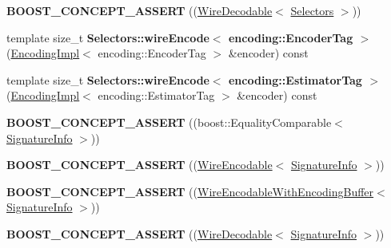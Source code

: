 \begin{DoxyCompactItemize}
\item 
{\bfseries B\+O\+O\+S\+T\+\_\+\+C\+O\+N\+C\+E\+P\+T\+\_\+\+A\+S\+S\+E\+RT} ((\hyperlink{classndn_1_1WireDecodable}{Wire\+Decodable}$<$ \hyperlink{classndn_1_1Selectors}{Selectors} $>$))\hypertarget{namespacendn_a677b3d73070aa153cf835c8416802717}{}\label{namespacendn_a677b3d73070aa153cf835c8416802717}

\item 
template size\+\_\+t {\bfseries Selectors\+::wire\+Encode$<$ encoding\+::\+Encoder\+Tag $>$} (\hyperlink{classndn_1_1encoding_1_1EncodingImpl}{Encoding\+Impl}$<$ encoding\+::\+Encoder\+Tag $>$ \&encoder) const\hypertarget{namespacendn_ab2ee85b9fceb3f1bd7cf1f25bd6071b1}{}\label{namespacendn_ab2ee85b9fceb3f1bd7cf1f25bd6071b1}

\item 
template size\+\_\+t {\bfseries Selectors\+::wire\+Encode$<$ encoding\+::\+Estimator\+Tag $>$} (\hyperlink{classndn_1_1encoding_1_1EncodingImpl}{Encoding\+Impl}$<$ encoding\+::\+Estimator\+Tag $>$ \&encoder) const\hypertarget{namespacendn_a2860609234ff0625a471be5b9ad144dc}{}\label{namespacendn_a2860609234ff0625a471be5b9ad144dc}

\item 
{\bfseries B\+O\+O\+S\+T\+\_\+\+C\+O\+N\+C\+E\+P\+T\+\_\+\+A\+S\+S\+E\+RT} ((boost\+::\+Equality\+Comparable$<$ \hyperlink{classndn_1_1SignatureInfo}{Signature\+Info} $>$))\hypertarget{namespacendn_a8b7141d65e44253576b4180f77ac761e}{}\label{namespacendn_a8b7141d65e44253576b4180f77ac761e}

\item 
{\bfseries B\+O\+O\+S\+T\+\_\+\+C\+O\+N\+C\+E\+P\+T\+\_\+\+A\+S\+S\+E\+RT} ((\hyperlink{classndn_1_1WireEncodable}{Wire\+Encodable}$<$ \hyperlink{classndn_1_1SignatureInfo}{Signature\+Info} $>$))\hypertarget{namespacendn_ab451cfbf2fd13dda7dbd98ac8f85fd9f}{}\label{namespacendn_ab451cfbf2fd13dda7dbd98ac8f85fd9f}

\item 
{\bfseries B\+O\+O\+S\+T\+\_\+\+C\+O\+N\+C\+E\+P\+T\+\_\+\+A\+S\+S\+E\+RT} ((\hyperlink{classndn_1_1WireEncodableWithEncodingBuffer}{Wire\+Encodable\+With\+Encoding\+Buffer}$<$ \hyperlink{classndn_1_1SignatureInfo}{Signature\+Info} $>$))\hypertarget{namespacendn_a86992d7b4f603d85032fa47591d24387}{}\label{namespacendn_a86992d7b4f603d85032fa47591d24387}

\item 
{\bfseries B\+O\+O\+S\+T\+\_\+\+C\+O\+N\+C\+E\+P\+T\+\_\+\+A\+S\+S\+E\+RT} ((\hyperlink{classndn_1_1WireDecodable}{Wire\+Decodable}$<$ \hyperlink{classndn_1_1SignatureInfo}{Signature\+Info} $>$))\hypertarget{namespacendn_a2e1c8e99471714cc02d8658b86e67a4d}{}\label{namespacendn_a2e1c8e99471714cc02d8658b86e67a4d}


\end{DoxyCompactItemize}
